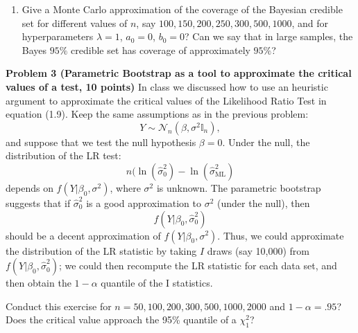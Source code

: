 \documentclass[11pt]{article} %
\begin{document}
\begin{enumerate}
\begin{enumerate}
\item Give a Monte Carlo approximation of the coverage of the Bayesian credible set for different values of $n$, say $100, 150, 200, 250, 300, 500, 1000$, and for hyperparameters $\lambda=1$, $a_0=0$, $b_0=0$? Can we say that in large samples, the Bayes $95\%$ credible set has coverage of approximately $95\%$?

\end{enumerate}

\noindent \textbf{Problem 3 (Parametric Bootstrap as a tool to approximate the critical values of a test, 10 points)} In class we discussed how to use an heuristic argument to approximate the critical values of the Likelihood Ratio Test in equation (1.9). Keep the same assumptions as in the previous problem:
\[ Y \sim \mathcal{N}_n(\beta, \sigma^2 \mathbb{I}_n), \]
 and suppose that we test the null hypothesis $\beta = 0$.  Under the null, the distribution of the LR test:
 $$ n (\ln (\widehat{\sigma}^2_0) - \ln(\widehat{\sigma}^2_{\textrm{ML}}) $$
depends on $f(Y | \beta_0, \sigma^2)$, where $\sigma^2$ is unknown. The parametric bootstrap suggests that if $\widehat{\sigma}^2_{0}$ is a good approximation to $\sigma^2$ (under the null), then  $$f(Y | \beta_0, \widehat{\sigma}^2_{0})$$
should be a decent approximation of $f(Y | \beta_0 , \sigma^2)$. Thus, we could approximate the distribution of the LR statistic by taking $I$ draws (say 10,000) from $f(Y | \beta_0, \widehat{\sigma}^2_{0})$; we could then recompute the LR statistic for each data set, and then obtain the $1-\alpha$ quantile of the I statistics. 

Conduct this exercise for $n=50,100,200, 300, 500,  1000, 2000$ and $1-\alpha= .95$? Does the critical value approach the 95\% quantile of a $\chi^2_1$?


\end{enumerate}




\end{document}
